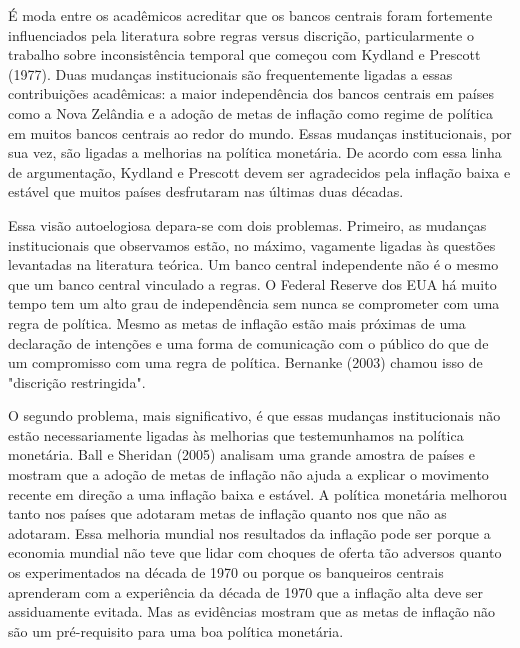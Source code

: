 \documentclass[12pt]{article}
\begin{document}
É moda entre os acadêmicos acreditar que os bancos centrais foram fortemente influenciados pela literatura sobre regras versus discrição, particularmente o trabalho sobre inconsistência temporal que começou com Kydland e Prescott (1977). Duas mudanças institucionais são frequentemente ligadas a essas contribuições acadêmicas: a maior independência dos bancos centrais em países como a Nova Zelândia e a adoção de metas de inflação como regime de política em muitos bancos centrais ao redor do mundo. Essas mudanças institucionais, por sua vez, são ligadas a melhorias na política monetária. De acordo com essa linha de argumentação, Kydland e Prescott devem ser agradecidos pela inflação baixa e estável que muitos países desfrutaram nas últimas duas décadas.

Essa visão autoelogiosa depara-se com dois problemas. Primeiro, as mudanças institucionais que observamos estão, no máximo, vagamente ligadas às questões levantadas na literatura teórica. Um banco central independente não é o mesmo que um banco central vinculado a regras. O Federal Reserve dos EUA há muito tempo tem um alto grau de independência sem nunca se comprometer com uma regra de política. Mesmo as metas de inflação estão mais próximas de uma declaração de intenções e uma forma de comunicação com o público do que de um compromisso com uma regra de política. Bernanke (2003) chamou isso de "discrição restringida".

O segundo problema, mais significativo, é que essas mudanças institucionais não estão necessariamente ligadas às melhorias que testemunhamos na política monetária. Ball e Sheridan (2005) analisam uma grande amostra de países e mostram que a adoção de metas de inflação não ajuda a explicar o movimento recente em direção a uma inflação baixa e estável. A política monetária melhorou tanto nos países que adotaram metas de inflação quanto nos que não as adotaram. Essa melhoria mundial nos resultados da inflação pode ser porque a economia mundial não teve que lidar com choques de oferta tão adversos quanto os experimentados na década de 1970 ou porque os banqueiros centrais aprenderam com a experiência da década de 1970 que a inflação alta deve ser assiduamente evitada. Mas as evidências mostram que as metas de inflação não são um pré-requisito para uma boa política monetária.
\end{document}
